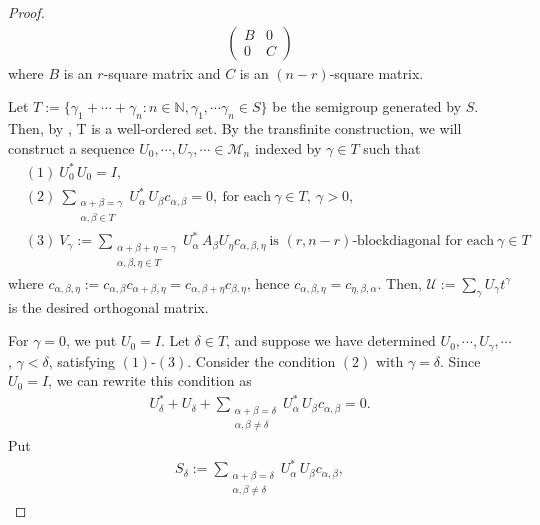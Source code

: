 \documentclass[12pt]{amsart}
\theoremstyle{plain}
\theoremstyle{definition}
\begin{document}
\begin{proof}
  \begin{align*}
    \begin{pmatrix}
      B & 0 \\
      0 & C
    \end{pmatrix}
  \end{align*}
    where $B$ is an $r$-square matrix and $C$ is an $(n-r)$-square matrix. \par 
  Let $T := \{\gamma_1 + \cdots + \gamma_n : n \in \mathbb{N}, \gamma_1, \cdots \gamma_n \in S\}$ be the semigroup generated by $S$. Then, by \cite[Theorem 3.4]{neu}, T is a well-ordered set. By the transfinite construction, we will construct a sequence $U_0, \cdots, U_{\gamma}, \cdots \in \mathcal{M}_n$ indexed by $\gamma \in T$ such that
 \begin{align*}
   & (1) \  U_0^* \, U_0 = I, \\
   & (2) \  \sum_{\substack{\alpha + \beta = \gamma \\ \alpha, \beta \in T}} U_{\alpha}^* \, U_{\beta} c_{\alpha, \beta} = 0, \ \text{for each} \ \gamma \in T, \ \gamma > 0, \\
   & (3) \ V_{\gamma} := \sum_{\substack{\alpha + \beta + \eta = \gamma \\ \alpha, \beta, \eta \in T}} U_{\alpha}^* \, A_{\beta} U_{\eta} c_{\alpha, \beta, \eta} \ \text{is $(r,n-r)$-blockdiagonal for each} \ \gamma \in T
 \end{align*} 
 where $c_{\alpha, \beta, \eta} := c_{\alpha, \beta} c_{\alpha + \beta, \eta} = c_{\alpha, \beta + \eta} c_{\beta, \eta}$, hence $c_{\alpha, \beta, \eta} = c_{\eta, \beta, \alpha}$. Then, $\mathcal{U} := \sum_{\gamma} U_{\gamma} t^{\gamma}$ is the desired orthogonal matrix. \par
  For $\gamma = 0$, we put $U_0 = I$. Let $\delta \in T$, and suppose we have determined $U_0, \cdots, U_{\gamma}, \cdots$, $\gamma < \delta$, satisfying $(1)$-$(3)$. Consider the condition $(2)$ with $\gamma = \delta$. Since $U_0 = I$, we can rewrite this condition as
  \begin{align*}
    U_{\delta}^* + U_{\delta} + \sum_{\substack{\alpha + \beta = \delta \\ \alpha, \beta \neq \delta}} U_{\alpha}^* \, U_{\beta} c_{\alpha, \beta} = 0.
  \end{align*}
  Put 
  \begin{align*}
    S_{\delta} := \sum_{\substack{\alpha + \beta = \delta \\ \alpha, \beta \neq \delta}} U_{\alpha}^* \, U_{\beta} c_{\alpha, \beta},
  \end{align*}

\end{proof}
\end{document}
